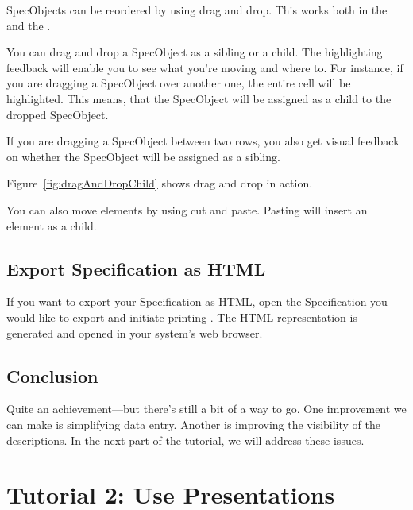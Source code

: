 SpecObjects can be reordered by using drag and drop.  This works both in the  and the .

You can drag and drop a SpecObject as a sibling or a child.  The highlighting feedback will enable you to see what you're moving and where to.  For instance, if you are dragging a SpecObject over another one, the entire cell will be highlighted.  This means, that the SpecObject will be assigned as a child to the dropped SpecObject.

If you are dragging a SpecObject between two rows, you also get visual feedback on whether the SpecObject will be assigned as a sibling.

Figure~\ref{fig:dragAndDropChild} shows drag and drop in action.

You can also move elements by using cut and paste.  Pasting will insert an element as a child.

\subsection{Export Specification as HTML}
\label{sec:export-specs}

If you want to export your Specification as HTML, open the Specification you would like to export and initiate printing .  The HTML representation is generated and opened in your system's web browser.

\subsection{Conclusion}
\label{sec:tutorial-conclusion}

Quite an achievement—but there's still a bit of a way to go.  One improvement we can make is simplifying data entry.  Another is improving  the visibility of the descriptions.  In the next part of the tutorial, we will address these issues.

\section{Tutorial 2: Use Presentations}
\label{sec:tutorial-presentations}

